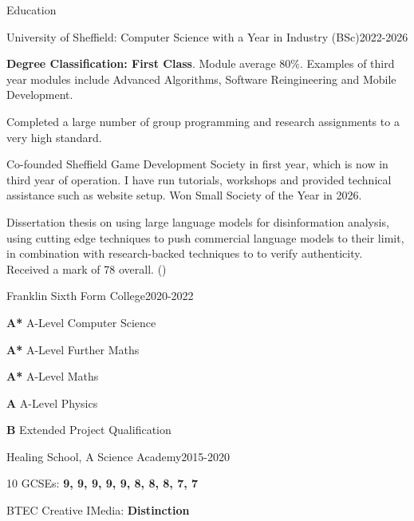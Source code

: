 \documentclass[
	a4paper,
	12pt,
]{resume}
\begin{document}
\begin{rSection}{Education}

\begin{rEdusection}{University of Sheffield: Computer Science with a Year in Industry (BSc)}{2022-2026}
\item \textbf{Degree Classification: First Class}. Module average 80\%. Examples of third year modules include Advanced Algorithms, Software Reingineering and Mobile Development.
\item Completed a large number of group programming and research assignments to a very high standard.
\item Co-founded Sheffield Game Development Society in first year, which is now in third year of operation. I have run tutorials, workshops and provided technical assistance such as website setup. Won Small Society of the Year in 2026.
\item Dissertation thesis on using large language models for disinformation analysis, using cutting edge techniques to push commercial language models to their limit, in combination with research-backed techniques to to verify authenticity. Received a mark of 78 overall. () 
\end{rEdusection}
	
\begin{rEdusection}{Franklin Sixth Form College}{2020-2022}
\item \textbf{A*} A-Level Computer Science 
\item \textbf{A*} A-Level Further Maths
\item \textbf{A*} A-Level Maths
\item \textbf{A} A-Level Physics
\item \textbf{B} Extended Project Qualification
\end{rEdusection}

\begin{rEdusection}{Healing School, A Science Academy}{2015-2020}
\item 10 GCSEs: \textbf{9, 9, 9, 9, 9, 8, 8, 8, 7, 7}
\item BTEC Creative IMedia: \textbf{Distinction}
\end{rEdusection}
	
\end{rSection}
\end{document}
